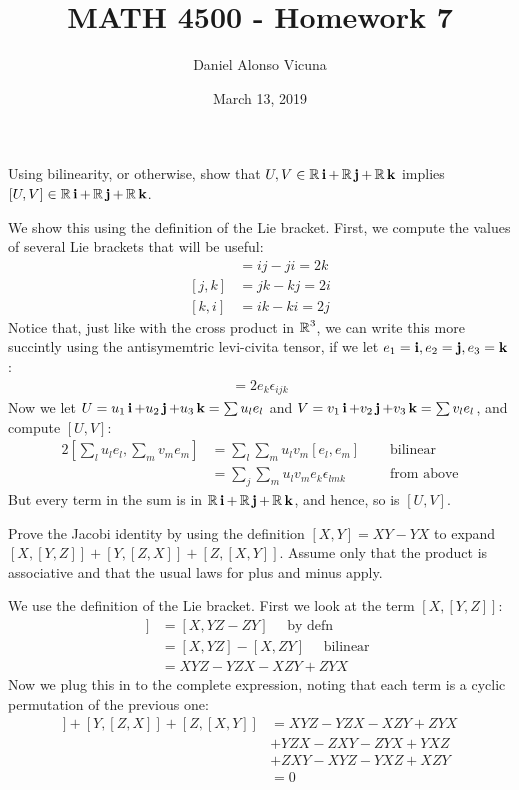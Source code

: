 \documentclass[12pt,onecolumn]{article}
\title{MATH 4500 - Homework 7}
\author{Daniel Alonso Vicuna}
\date{March 13, 2019}
\begin{document}
\maketitle

\begin{exercise}
Using bilinearity, or otherwise, show that $U,V \in \operatorname{\mathbb{R}} \operatorname{\textbf{i}}+ \operatorname{\mathbb{R}} \operatorname{\textbf{j}}+ \operatorname{\mathbb{R}} \operatorname{\textbf{k}}$ implies $[U,V] \in  \operatorname{\mathbb{R}} \operatorname{\textbf{i}}+ \operatorname{\mathbb{R}} \operatorname{\textbf{j}}+ \operatorname{\mathbb{R}} \operatorname{\textbf{k}}$.
\end{exercise}
\begin{answer}
We show this using the definition of the Lie bracket. First, we compute the values of several Lie brackets that will be useful:
\begin{align*}
    [i,j] &= ij - ji = 2k \\
    [j,k] &= jk - kj = 2i \\
    [k,i] &= ik - ki = 2j 
\end{align*}
Notice that, just like with the cross product in $\operatorname{\mathbb{R}}^3$, we can write this more succintly using the antisymemtric levi-civita tensor, if we let $e_1=\operatorname{\textbf{i}}, e_2=\operatorname{\textbf{j}}, e_3=\operatorname{\textbf{k}}$:
\begin{align*}
    [e_i, e_j] = 2 e_k \epsilon_{ijk}
\end{align*}
Now we let $U = u_1\operatorname{\textbf{i}} + u_2\operatorname{\textbf{j}} + u_3\operatorname{\textbf{k}} = \sum u_l e_l$ and $V = v_1\operatorname{\textbf{i}} + v_2\operatorname{\textbf{j}} + v_3\operatorname{\textbf{k}} = \sum v_l e_l$, and compute $[U,V]$:
\begin{alignat*}{2}
    [\sum_l u_l e_l, \sum_m v_m e_m] &= \sum_l \sum_m u_l v_m [e_l,e_m] \quad &\text{ bilinear} \\
    &= \sum_j \sum_m u_l v_m e_k \epsilon_{lmk} \quad &\text{ from above}
\end{alignat*}
But every term in the sum is in $\operatorname{\mathbb{R}}\operatorname{\textbf{i}} + \operatorname{\mathbb{R}}\operatorname{\textbf{j}} + \operatorname{\mathbb{R}}\operatorname{\textbf{k}}$, and hence, so is $[U,V]$.
\end{answer}
\begin{exercise}
Prove the Jacobi identity by using the deﬁnition $[X,Y]=XY-YX$ to expand $[X,[Y,Z]]+[Y,[Z,X]]+[Z,[X,Y]]$. Assume only that the product is associative and that the usual laws for plus and minus apply. 
\end{exercise}
\begin{answer}
We use the definition of the Lie bracket. First we look at the term $[X,[Y,Z]]$:
\begin{align*}
    [X,[Y,Z]] &= [X,YZ - ZY] \quad \text{ by defn } \\
    &= [X,YZ] - [X,ZY] \quad \text{ bilinear } \\
    &= XYZ - YZX - XZY + ZYX
\end{align*}
Now we plug this in to the complete expression, noting that each term is a cyclic permutation of the previous one:
\begin{align*}
    [X,[Y,Z]]+[Y,[Z,X]]+[Z,[X,Y]] &= XYZ - YZX - XZY + ZYX \\
    &+ YZX - ZXY - ZYX + YXZ \\
    &+ ZXY - XYZ - YXZ + XZY \\
    &= 0
\end{align*}
\end{answer}
\end{document}
